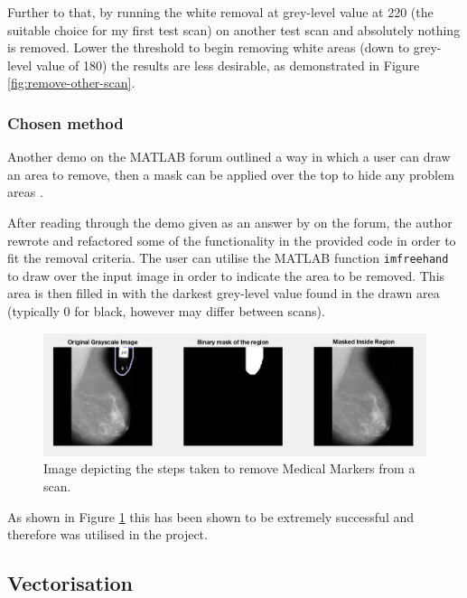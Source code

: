 Further to that, by running the white removal at grey-level value at 220 (the suitable choice for my first test scan) on another test scan and absolutely nothing is removed. Lower the threshold to begin removing white areas (down to grey-level value of 180) the results are less desirable, as demonstrated in Figure \ref{fig:remove-other-scan}.

\subsubsection{Chosen method}

Another demo on the MATLAB forum outlined a way in which a user can draw an area to remove, then a mask can be applied over the top to hide any problem areas \cite{binary_mask}.

After reading through the demo given as an answer by  on the forum, the author rewrote and refactored some of the functionality in the provided code in order to fit the removal criteria. The user can utilise the MATLAB function \texttt{imfreehand} \cite{imfreehand} to draw over the input image in order to indicate the area to be removed. This area is then filled in with the darkest grey-level value found in the drawn area (typically 0 for black, however may differ between scans).

\begin{figure}[H]
  \centering
  \includegraphics[scale=0.4]{Chapter2/technical-img/draw-to-remove.png}
  \caption{Image depicting the steps taken to remove Medical Markers from a scan.}
  \label{fig:remove-marker}
\end{figure}

As shown in Figure \ref{fig:remove-marker} this has been shown to be extremely successful and therefore was utilised in the project.



\subsection{Vectorisation}
\label{ssec:vectorisation}

